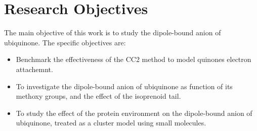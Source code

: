 \section{Research Objectives}
The main objective of this work is to study the dipole-bound anion of ubiquinone. The specific objectives are:
\begin{itemize}
  \item Benchmark the effectiveness of the CC2 method to model quinones electron attachemnt.
  \item To investigate the dipole-bound anion of ubiquinone as function of its methoxy groups, and the effect of the isoprenoid tail.
  \item To study the effect of the protein environment on the dipole-bound anion of ubiquinone, treated as a cluster model using small molecules.
\end{itemize}

\cleardoublepage

